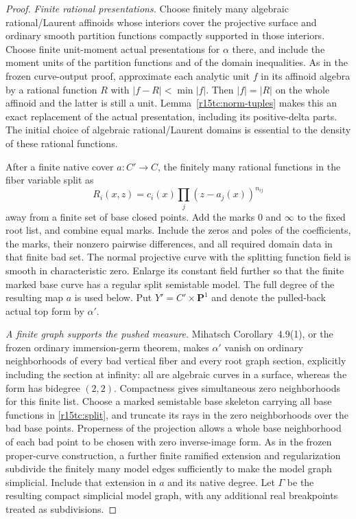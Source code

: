 \begin{proof}
\emph{Finite rational presentations.}
Choose finitely many algebraic rational/Laurent affinoids
whose interiors cover the projective surface and ordinary
smooth partition functions compactly supported in those
interiors.  Choose finite unit-moment actual presentations
for $\alpha$ there, and include the moment units of the
partition functions and of the domain inequalities.
As in the frozen curve-output proof, approximate each analytic
unit $f$ in its affinoid algebra by a rational function $R$
with $|f-R|<\min|f|$.  Then $|f|=|R|$ on the whole affinoid
and the latter is still a unit.  Lemma~\ref{r15tc:norm-tuples}
makes this an exact replacement of the actual presentation,
including its positive-delta parts.  The initial choice of
algebraic rational/Laurent domains is essential to the density
of these rational functions.

After a finite native cover $a:C'\to C$, the finitely many
rational functions in the fiber variable split as
\[
                   R_i(x,z)=c_i(x)\prod_j(z-a_j(x))^{n_{ij}}
\tag{TC15.5}\label{r15tc:split}
\]
away from a finite set of base closed points.  Add the marks
$0$ and $\infty$ to the fixed root list, and combine equal
marks.  Include the zeros and poles of the coefficients,
the marks, their nonzero pairwise differences, and all required
domain data in that finite bad set.  The normal projective
curve with the splitting function field is smooth in
characteristic zero.  Enlarge its constant field further so
that the finite marked base curve has a regular split
semistable model.  The full degree of the resulting map $a$
is used below.  Put $Y'=C'\times\mathbf P^1$ and denote
the pulled-back actual top form by $\alpha'$.

\emph{A finite graph supports the pushed measure.}
Mihatsch Corollary~4.9(1), or the frozen ordinary
immersion-germ theorem, makes $\alpha'$ vanish on ordinary
neighborhoods of every bad vertical fiber and every root
graph section, explicitly including the section at infinity:
all are algebraic curves in a surface, whereas
the form has bidegree $(2,2)$.  Compactness gives simultaneous
zero neighborhoods for this finite list.  Choose a marked
semistable base skeleton carrying all base functions in
\eqref{r15tc:split}, and truncate its rays in the zero
neighborhoods over the bad base points.  Properness of the
projection allows a whole base neighborhood of each bad
point to be chosen with zero inverse-image form.  As in the
frozen proper-curve construction, a further finite ramified
extension and regularization subdivide the finitely many
model edges sufficiently to make the model graph simplicial.
Include that extension in $a$ and its native degree.  Let
$\Gamma$ be the resulting compact simplicial model graph,
with any additional real breakpoints treated as subdivisions.


\end{proof}
